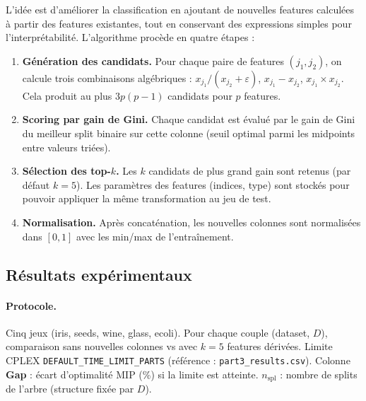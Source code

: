 \documentclass[a4paper,10pt,titlepage,leqno]{article}
\begin{document}
L'idée est d'améliorer la classification en ajoutant de nouvelles features calculées à partir des features existantes, tout en conservant des expressions simples pour l'interprétabilité. L'algorithme procède en quatre étapes :

\begin{enumerate}
  \item \textbf{Génération des candidats.} Pour chaque paire de features $(j_1, j_2)$, on calcule trois combinaisons algébriques : $x_{j_1} / (x_{j_2} + \varepsilon)$, $x_{j_1} - x_{j_2}$, $x_{j_1} \times x_{j_2}$. Cela produit au plus $3 p(p-1)$ candidats pour $p$ features.
  \item \textbf{Scoring par gain de Gini.} Chaque candidat est évalué par le gain de Gini du meilleur split binaire sur cette colonne (seuil optimal parmi les midpoints entre valeurs triées).
  \item \textbf{Sélection des top-$k$.} Les $k$ candidats de plus grand gain sont retenus (par défaut $k{=}5$). Les paramètres des features (indices, type) sont stockés pour pouvoir appliquer la même transformation au jeu de test.
  \item \textbf{Normalisation.} Après concaténation, les nouvelles colonnes sont normalisées dans $[0,1]$ avec les min/max de l'entraînement.
\end{enumerate}

\subsection{Résultats expérimentaux}

\paragraph{Protocole.} Cinq jeux (iris, seeds, wine, glass, ecoli). Pour chaque couple (dataset, $D$), comparaison sans nouvelles colonnes vs avec $k{=}5$ features dérivées. Limite CPLEX \texttt{DEFAULT\_TIME\_LIMIT\_PARTS} (référence : \texttt{part3\_results.csv}). Colonne \textbf{Gap} : écart d'optimalité MIP (\%) si la limite est atteinte. $n_{\text{spl}}$ : nombre de splits de l'arbre (structure fixée par $D$).
\end{document}
